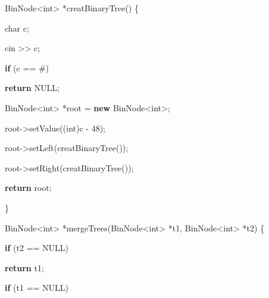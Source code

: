 \documentclass[
]{article}
\newenvironment{Shaded}{}{}
\newcommand{\CharTok}[1]{\textcolor[rgb]{0.25,0.44,0.63}{#1}}
\newcommand{\ControlFlowTok}[1]{\textcolor[rgb]{0.00,0.44,0.13}{\textbf{#1}}}
\newcommand{\DataTypeTok}[1]{\textcolor[rgb]{0.56,0.13,0.00}{#1}}
\newcommand{\DecValTok}[1]{\textcolor[rgb]{0.25,0.63,0.44}{#1}}
\newcommand{\KeywordTok}[1]{\textcolor[rgb]{0.00,0.44,0.13}{\textbf{#1}}}
\newcommand{\NormalTok}[1]{#1}
\newcommand{\OperatorTok}[1]{\textcolor[rgb]{0.40,0.40,0.40}{#1}}
\begin{document}
\begin{Shaded}
\begin{Highlighting}[]
\NormalTok{BinNode}\OperatorTok{\textless{}}\DataTypeTok{int}\OperatorTok{\textgreater{}} \OperatorTok{*}\NormalTok{creatBinaryTree}\OperatorTok{()} \OperatorTok{\{}

	\DataTypeTok{char}\NormalTok{ c}\OperatorTok{;}

\NormalTok{	cin }\OperatorTok{\textgreater{}\textgreater{}}\NormalTok{ c}\OperatorTok{;}

	\ControlFlowTok{if} \OperatorTok{(}\NormalTok{c }\OperatorTok{==} \CharTok{\textquotesingle{}\#\textquotesingle{}}\OperatorTok{)}

		\ControlFlowTok{return}\NormalTok{ NULL}\OperatorTok{;}

\NormalTok{	BinNode}\OperatorTok{\textless{}}\DataTypeTok{int}\OperatorTok{\textgreater{}} \OperatorTok{*}\NormalTok{root }\OperatorTok{=} \KeywordTok{new}\NormalTok{ BinNode}\OperatorTok{\textless{}}\DataTypeTok{int}\OperatorTok{\textgreater{};}

\NormalTok{	root}\OperatorTok{{-}\textgreater{}}\NormalTok{setValue}\OperatorTok{((}\DataTypeTok{int}\OperatorTok{)}\NormalTok{c }\OperatorTok{{-}} \DecValTok{48}\OperatorTok{);}

\NormalTok{	root}\OperatorTok{{-}\textgreater{}}\NormalTok{setLeft}\OperatorTok{(}\NormalTok{creatBinaryTree}\OperatorTok{());}

\NormalTok{	root}\OperatorTok{{-}\textgreater{}}\NormalTok{setRight}\OperatorTok{(}\NormalTok{creatBinaryTree}\OperatorTok{());}

	\ControlFlowTok{return}\NormalTok{ root}\OperatorTok{;}

\OperatorTok{\}}



\NormalTok{BinNode}\OperatorTok{\textless{}}\DataTypeTok{int}\OperatorTok{\textgreater{}} \OperatorTok{*}\NormalTok{mergeTrees}\OperatorTok{(}\NormalTok{BinNode}\OperatorTok{\textless{}}\DataTypeTok{int}\OperatorTok{\textgreater{}} \OperatorTok{*}\NormalTok{t1}\OperatorTok{,}\NormalTok{ BinNode}\OperatorTok{\textless{}}\DataTypeTok{int}\OperatorTok{\textgreater{}} \OperatorTok{*}\NormalTok{t2}\OperatorTok{)} \OperatorTok{\{}

	\ControlFlowTok{if} \OperatorTok{(}\NormalTok{t2 }\OperatorTok{==}\NormalTok{ NULL}\OperatorTok{)}

		\ControlFlowTok{return}\NormalTok{ t1}\OperatorTok{;}

	\ControlFlowTok{if} \OperatorTok{(}\NormalTok{t1 }\OperatorTok{==}\NormalTok{ NULL}\OperatorTok{)}


\end{Highlighting}
\end{Shaded}
\end{document}
